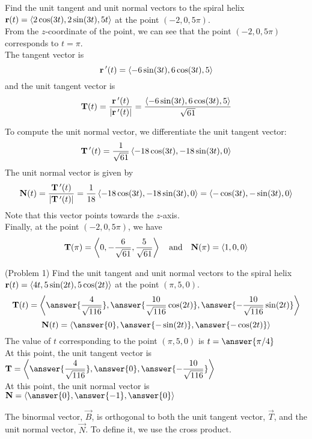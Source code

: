 \documentclass[handout]{ximera}
\begin{document}
\begin{example}[example 1]
Find the unit tangent and unit normal vectors to the spiral helix $\mathbf r(t) =  \left\langle 2\cos(3t), 2\sin(3t), 5t\right\rangle$ at the point $(-2, 0, 5\pi)$.\\
From the $z$-coordinate of the point, we can see that the point $(-2, 0, 5\pi)$ corresponds to $t = \pi$.\\
The tangent vector is
\[
\mathbf r \,'(t) = \left\langle -6 \sin(3t), 6\cos(3t), 5\right\rangle
\]
and the unit tangent vector is
\[
\mathbf T(t) = \frac{\mathbf r\,'(t)}{|\mathbf r\,'(t)|} = \frac{\left\langle -6 \sin(3t), 6\cos(3t), 5\right\rangle}{\sqrt{61}}
\]

To compute the unit normal vector, we differentiate the unit tangent vector:
\[
\mathbf T\,'(t) = \frac{1}{\sqrt{61}} \left\langle -18 \cos(3t), -18 \sin(3t), 0\right\rangle
\]
The unit normal vector is given by
\[
\mathbf N(t) = \frac{\mathbf T\,'(t)}{|\mathbf T\,'(t)|} = \frac{1}{18} \left\langle -18 \cos(3t), -18 \sin(3t), 0\right\rangle = \left\langle -\cos(3t), -\sin(3t), 0\right\rangle
\]
Note that this vector points towards the $z$-axis.\\
Finally, at the point $(-2, 0, 5\pi)$, we have
\[
\mathbf T(\pi) = \left\langle 0, -\frac{6}{\sqrt{61}}, \frac{5}{\sqrt{61}}\right\rangle \quad \text{and} \quad \mathbf N(\pi) = \left\langle 1, 0, 0\right\rangle
\]
\end{example}


\begin{problem}(Problem 1)
Find the unit tangent and unit normal vectors to the spiral helix $\mathbf r(t) = \left\langle 4t, 5 \sin(2t),5\cos(2t)\right\rangle$ at the point $(\pi, 5, 0)$.\\
\[
\vec T(t) = \vector{\answer{\frac{4}{\sqrt{116}}}, \answer{\frac{10}{\sqrt{116}}\cos(2t)}, \answer{-\frac{10}{\sqrt{116}}\sin(2t)}}
\]
\[
\vec N(t) = \vector{\answer{0}, \answer{-\sin(2t)}, \answer{-\cos(2t)}}
\]
The value of $t$ corresponding to the point $(\pi, 5, 0)$ is $t = \answer{\pi /4}$\\

At this point, the unit tangent vector is $\displaystyle \vec T = \vector{\answer{\frac{4}{\sqrt{116}}}, \answer{0}, \answer{-\frac{10}{\sqrt{116}}}}$\\
At this point, the unit normal vector is $\displaystyle \vec N = \vector{\answer{0}, \answer{-1}, \answer{0}}$\\

\end{problem}





The binormal vector, $\vec B$, is orthogonal to both the unit tangent vector, $\vec T$, and the unit normal vector, $\vec N$. To define it, we use the cross product.
\end{document}

